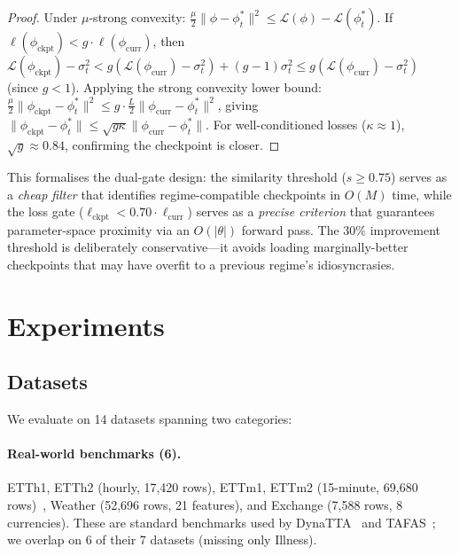 \documentclass[11pt,a4paper]{article}
\begin{document}
\begin{proof}
Under $\mu$-strong convexity: $\frac{\mu}{2}\|\phi - \phi^*_t\|^2 \leq \mathcal{L}(\phi) - \mathcal{L}(\phi^*_t)$. If $\ell(\phi_{\text{ckpt}}) < g \cdot \ell(\phi_{\text{curr}})$, then $\mathcal{L}(\phi_{\text{ckpt}}) - \sigma^2_t < g(\mathcal{L}(\phi_{\text{curr}}) - \sigma^2_t) + (g-1)\sigma^2_t \leq g(\mathcal{L}(\phi_{\text{curr}}) - \sigma^2_t)$ (since $g < 1$). Applying the strong convexity lower bound: $\frac{\mu}{2}\|\phi_{\text{ckpt}} - \phi^*_t\|^2 \leq g \cdot \frac{L}{2}\|\phi_{\text{curr}} - \phi^*_t\|^2$, giving $\|\phi_{\text{ckpt}} - \phi^*_t\| \leq \sqrt{g \kappa} \|\phi_{\text{curr}} - \phi^*_t\|$. For well-conditioned losses ($\kappa \approx 1$), $\sqrt{g} \approx 0.84$, confirming the checkpoint is closer.
\end{proof}

This formalises the dual-gate design: the similarity threshold ($s \geq 0.75$) serves as a \emph{cheap filter} that identifies regime-compatible checkpoints in $O(M)$ time, while the loss gate ($\ell_{\text{ckpt}} < 0.70 \cdot \ell_{\text{curr}}$) serves as a \emph{precise criterion} that guarantees parameter-space proximity via an $O(|\theta|)$ forward pass. The 30\% improvement threshold is deliberately conservative---it avoids loading marginally-better checkpoints that may have overfit to a previous regime's idiosyncrasies.


\section{Experiments}
\label{sec:experiments}

\subsection{Datasets}

We evaluate on 14 datasets spanning two categories:

\paragraph{Real-world benchmarks (6).} ETTh1, ETTh2 (hourly, 17,420 rows), ETTm1, ETTm2 (15-minute, 69,680 rows)~\citep{zhou2021informer}, Weather (52,696 rows, 21 features), and Exchange (7,588 rows, 8 currencies). These are standard benchmarks used by DynaTTA~\citep{grover2025dynatta} and TAFAS~\citep{kim2025tafas}; we overlap on 6 of their 7 datasets (missing only Illness).
\end{document}
